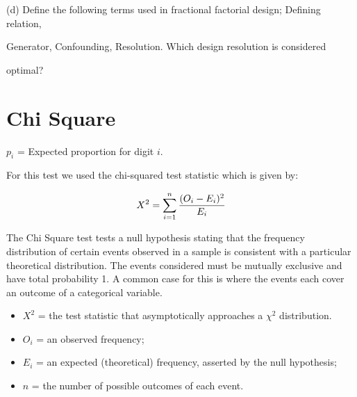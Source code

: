  

(d)          Define the following terms used in fractional factorial design; Defining relation,

                Generator, Confounding, Resolution. Which design resolution is considered

                optimal?

 










\section{Chi Square}

 



$p_{i}$ = Expected proportion for digit $i$.

 

For this test we used the chi-squared test statistic which is given by:

\begin{equation}

X^2 = \sum_{i=1}^{n} {(O_i - E_i)^2 \over E_i}

\end{equation}

 



The Chi Square test tests a null hypothesis stating that the frequency distribution of certain events observed in a sample is consistent with a particular theoretical distribution. The events considered must be mutually exclusive and have total probability 1. A common case for this is where the events each cover an outcome of a categorical variable.

 

\begin{itemize}

\item $X^2$ = the test statistic that asymptotically approaches a $\chi^2$ distribution.

\item $O_i$ = an observed frequency;

\item $E_i$ = an expected (theoretical) frequency, asserted by the null hypothesis;

\item $n $  = the number of possible outcomes of each event.

\end{itemize}

